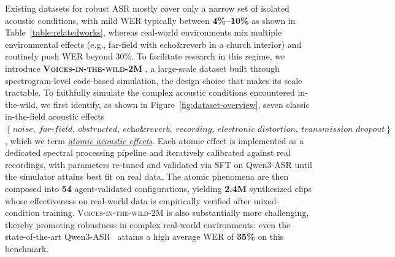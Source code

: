 \documentclass{article}
\begin{document}
Existing datasets for robust ASR mostly cover only a narrow set of isolated acoustic conditions, with mild WER typically between\textbf{ 4\%--10\%} as shown in Table~\ref{table:relatedworks}, whereas real-world environments mix multiple environmental effects (e.g., far-field with echo\&reverb in a church interior) and routinely push WER beyond 30\%. To facilitate research in this regime, we introduce \textbf{ \textsc{Voices-in-the-wild-2M} }, a large-scale dataset built through spectrogram-level code-based simulation, the design choice that makes its scale tractable. To faithfully simulate the complex acoustic conditions encountered in-the-wild, we first identify, as shown in Figure~\ref{fig:dataset-overview}, seven classic in-the-field acoustic effects $\left\{\textit{noise},\ \textit{far-field},\ \textit{obstructed},\ \textit{echo\&reverb},\ \textit{recording},\ \textit{electronic distortion},\ \textit{transmission dropout}\right\}$, which we term \underline{\textit{atomic acoustic effects}}. Each atomic effect is implemented as a dedicated spectral processing pipeline and iteratively calibrated against real recordings, with parameters re-tuned and validated via SFT on Qwen3-ASR until the simulator attains best fit on real data. The atomic phenomena are then composed into \textbf{54} agent-validated configurations, yielding \textbf{2.4M} synthesized clips whose effectiveness on real-world data is empirically verified after mixed-condition training.  \textsc{Voices-in-the-wild-2M}  is also substantially more challenging, thereby promoting robustness in complex real-world environments: even the state-of-the-art Qwen3-ASR~\citep{qwen3-asr} attains a high average WER of \textbf{35\%} on this benchmark.
\end{document}
